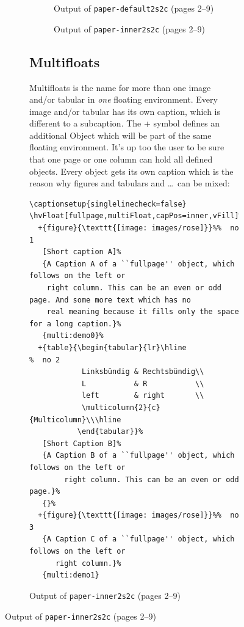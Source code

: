 \documentclass[twoside,paper=a4,usegeometry]{scrartcl}
\begin{document}
\begin{figure}[p]
\begin{figure}[p]
\begin{figure}
\caption{Output of \texttt{paper-default2s2c} (pages 2--9)}\label{paper-default2s2c}
\end{figure}


\begin{figure}
\hfill
{}\hfill
{}\hfill
{}

\hfill
{}\hfill
{}\hfill
{}

\caption{Output of \texttt{paper-inner2s2c} (pages 2--9)}\label{paper-inner2s2c}
\end{figure}


\FloatBarrier


\subsection{Multifloats}
Multifloats is the name for more than one image and/or tabular in \emph{one} floating
environment. Every image and/or tabular has its own caption, which is different to
a subcaption. 
The + symbol defines an additional Object which will be part of the same floating environment.
It's up too the user to be sure that one page or one column can hold all defined objects.
Every object gets its own caption which is the reason why figures and tabulars and \ldots\ 
can be mixed:

\begin{lstlisting}
\captionsetup{singlelinecheck=false}
\hvFloat[fullpage,multiFloat,capPos=inner,vFill]%
  +{figure}{\texttt{[image: images/rose]}}%%  no 1
   [Short caption A]%
   {A Caption A of a ``fullpage'' object, which follows on the left or
    right column. This can be an even or odd page. And some more text which has no
    real meaning because it fills only the space for a long caption.}%
   {multi:demo0}%
  +{table}{\begin{tabular}{lr}\hline                 %  no 2
            Linksbündig & Rechtsbündig\\
            L           & R           \\
            left        & right       \\
            \multicolumn{2}{c}{Multicolumn}\\\hline
           \end{tabular}}%
   [Short Caption B]%
   {A Caption B of a ``fullpage'' object, which follows on the left or
        right column. This can be an even or odd page.}%
   {}%
  +{figure}{\texttt{[image: images/rose]}}%%  no 3
   {A Caption C of a ``fullpage'' object, which follows on the left or
      right column.}%
   {multi:demo1}
\end{lstlisting}




\end{figure}
\end{figure}
\end{document}
